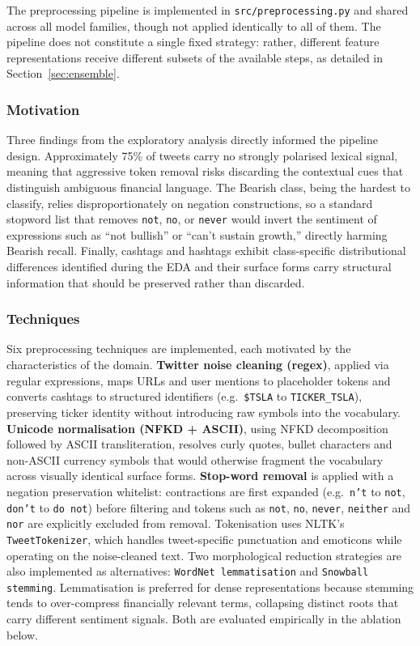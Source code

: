 \documentclass[11pt,a4paper]{article}
\begin{document}
The preprocessing pipeline is implemented in \texttt{src/preprocessing.py} and shared
across all model families, though not applied identically to all of them. The pipeline
does not constitute a single fixed strategy: rather, different feature representations
receive different subsets of the available steps, as detailed in
Section~\ref{sec:ensemble}.

\subsubsection{Motivation}

Three findings from the exploratory analysis directly informed the pipeline design.
Approximately 75\% of tweets carry no strongly polarised lexical signal, meaning that
aggressive token removal risks discarding the contextual cues that distinguish ambiguous
financial language. The Bearish class, being the hardest to classify, relies
disproportionately on negation constructions, so a standard stopword list that removes
\texttt{not}, \texttt{no}, or \texttt{never} would invert the sentiment of expressions
such as ``not bullish'' or ``can't sustain growth,'' directly harming Bearish recall.
Finally, cashtags and hashtags exhibit class-specific distributional differences
identified during the EDA and their surface forms carry structural information that
should be preserved rather than discarded.

\subsubsection{Techniques}

Six preprocessing techniques are implemented, each motivated by the characteristics of
the domain. \textbf{Twitter noise cleaning (regex)}, applied via regular expressions, maps URLs and user
mentions to placeholder tokens and converts cashtags to structured identifiers (e.g.\
\texttt{\$TSLA} to \texttt{TICKER\_TSLA}), preserving ticker identity without introducing
raw symbols into the vocabulary. \textbf{Unicode normalisation (NFKD + ASCII)}, using NFKD decomposition followed
by ASCII transliteration, resolves curly quotes, bullet characters and non-ASCII currency
symbols that would otherwise fragment the vocabulary across visually identical surface
forms. \textbf{Stop-word removal} is applied with a negation preservation whitelist: contractions
are first expanded (e.g.\ \texttt{n't} to \texttt{not}, \texttt{don't} to \texttt{do not})
before filtering and tokens such as \texttt{not}, \texttt{no}, \texttt{never},
\texttt{neither} and \texttt{nor} are explicitly excluded from removal. Tokenisation uses
NLTK's \texttt{TweetTokenizer}, which handles tweet-specific punctuation and emoticons
while operating on the noise-cleaned text. Two morphological reduction strategies are also
implemented as alternatives: \texttt{WordNet lemmatisation} and \texttt{Snowball stemming}. Lemmatisation is
preferred for dense representations because stemming tends to over-compress financially
relevant terms, collapsing distinct roots that carry different sentiment signals. Both are
evaluated empirically in the ablation below.
\end{document}

